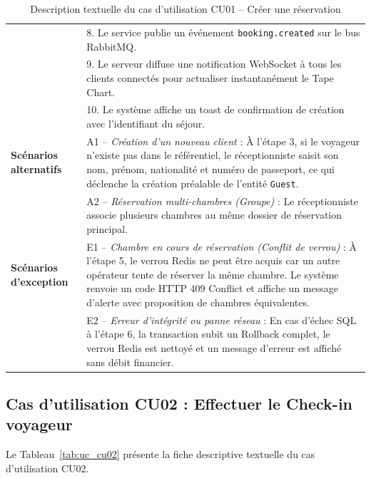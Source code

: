 \begin{table}[H]
\begin{tabularx}{\textwidth}{|p{3.5cm}|X|}
& 8. Le service publie un événement \texttt{booking.created} sur le bus RabbitMQ.\\
& 9. Le serveur diffuse une notification WebSocket à tous les clients connectés pour actualiser instantanément le Tape Chart.\\
& 10. Le système affiche un toast de confirmation de création avec l'identifiant du séjour.\\
\hline
\textbf{Scénarios alternatifs} & 
A1 -- \textit{Création d'un nouveau client} : À l'étape 3, si le voyageur n'existe pas dans le référentiel, le réceptionniste saisit son nom, prénom, nationalité et numéro de passeport, ce qui déclenche la création préalable de l'entité \texttt{Guest}.\\
& A2 -- \textit{Réservation multi-chambres (Groupe)} : Le réceptionniste associe plusieurs chambres au même dossier de réservation principal.\\
\hline
\textbf{Scénarios d'exception} & 
E1 -- \textit{Chambre en cours de réservation (Conflit de verrou)} : À l'étape 5, le verrou Redis ne peut être acquis car un autre opérateur tente de réserver la même chambre. Le système renvoie un code HTTP 409 Conflict et affiche un message d'alerte avec proposition de chambres équivalentes.\\
& E2 -- \textit{Erreur d'intégrité ou panne réseau} : En cas d'échec SQL à l'étape 6, la transaction subit un Rollback complet, le verrou Redis est nettoyé et un message d'erreur est affiché sans débit financier.\\
\hline
\end{tabularx}
\caption{Description textuelle du cas d'utilisation CU01 -- Créer une réservation}
\label{tab:uc_cu01}
\end{table}

\subsection{Cas d'utilisation CU02 : Effectuer le Check-in voyageur}

Le Tableau~\ref{tab:uc_cu02} présente la fiche descriptive textuelle du cas d'utilisation CU02.


